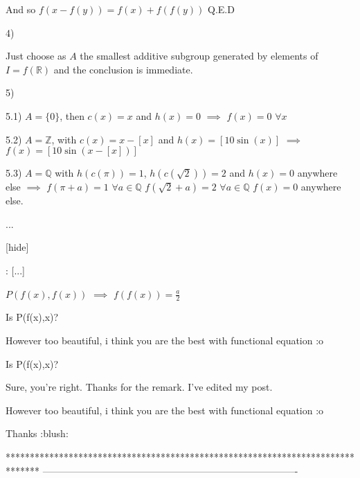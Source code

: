 \begin{solution}
And so $ f(x - f(y)) = f(x) + f(f(y))$
Q.E.D

4) 
Just choose as $ A$ the smallest additive subgroup generated by elements of $ I = f(\mathbb R)$ and the conclusion is immediate.

5) 
5.1) $ A = \{0\}$, then $ c(x) = x$ and $ h(x) = 0$ $ \implies$ $ f(x) = 0$ $ \forall x$

5.2) $ A = \mathbb Z$, with $ c(x) = x - [x]$ and $ h(x) = [10\sin(x)]$ $ \implies$ $ f(x) = [10\sin(x - [x])]$

5.3) $ A = \mathbb Q$ with $ h(c(\pi)) = 1$, $ h(c(\sqrt 2)) = 2$ and $ h(x) = 0$ anywhere else $ \implies$
$ f(\pi + a) = 1$ $ \forall a\in\mathbb Q$
$ f(\sqrt 2 + a) = 2$ $ \forall a\in\mathbb Q$
$ f(x) = 0$ anywhere else.


...

[\/hide]
\end{solution}



\begin{solution}
	\begin{tcolorbox} :
[...]

$ P(f(x),f(x))$ $ \implies$ $ f(f(x)) = \frac a2$ \end{tcolorbox}

Is P(f(x),x)?

However too beautiful, i think you are the best with functional equation  :o
\end{solution}



\begin{solution}
	\begin{tcolorbox} Is P(f(x),x)?\end{tcolorbox}
Sure, you're right. Thanks for the remark. I've edited my post.

\begin{tcolorbox} However too beautiful, i think you are the best with functional equation  :o\end{tcolorbox}
Thanks  :blush:
\end{solution}
*******************************************************************************
-------------------------------------------------------------------------------


